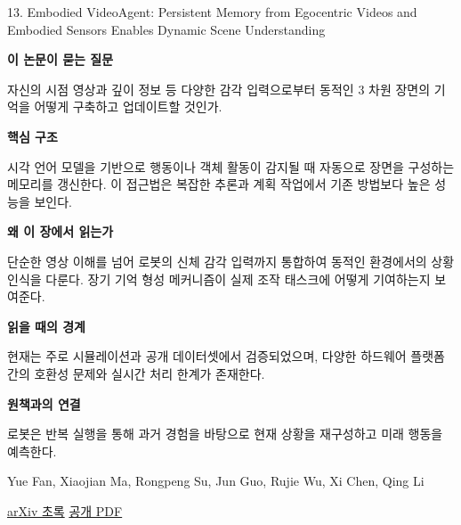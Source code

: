 \documentclass[11pt,openany]{book}
\begin{document}
\begin{termcard}{13. Embodied VideoAgent: Persistent Memory from Egocentric Videos and Embodied Sensors Enables Dynamic Scene Understanding}

\par

\medskip

{\sffamily\bfseries\color{deepblue} 이 논문이 묻는 질문}\par

자신의 시점 영상과 깊이 정보 등 다양한 감각 입력으로부터 동적인 3 차원 장면의 기억을 어떻게 구축하고 업데이트할 것인가.

\smallskip

{\sffamily\bfseries\color{deepblue} 핵심 구조}\par

시각 언어 모델을 기반으로 행동이나 객체 활동이 감지될 때 자동으로 장면을 구성하는 메모리를 갱신한다. 이 접근법은 복잡한 추론과 계획 작업에서 기존 방법보다 높은 성능을 보인다.

\smallskip

{\sffamily\bfseries\color{deepblue} 왜 이 장에서 읽는가}\par

단순한 영상 이해를 넘어 로봇의 신체 감각 입력까지 통합하여 동적인 환경에서의 상황 인식을 다룬다. 장기 기억 형성 메커니즘이 실제 조작 태스크에 어떻게 기여하는지 보여준다.

\smallskip

{\sffamily\bfseries\color{coral} 읽을 때의 경계}\par

현재는 주로 시뮬레이션과 공개 데이터셋에서 검증되었으며, 다양한 하드웨어 플랫폼 간의 호환성 문제와 실시간 처리 한계가 존재한다.

\smallskip

{\sffamily\bfseries\color{teal} 원책과의 연결}\par

로봇은 반복 실행을 통해 과거 경험을 바탕으로 현재 상황을 재구성하고 미래 행동을 예측한다.

\medskip

{\footnotesize\color{muted} Yue Fan, Xiaojian Ma, Rongpeng Su, Jun Guo, Rujie Wu, Xi Chen, Qing Li\par

\href{https://arxiv.org/abs/2501.00358}{arXiv 초록} \quad \href{https://arxiv.org/pdf/2501.00358}{공개 PDF}\par}

\end{termcard}
\end{document}
